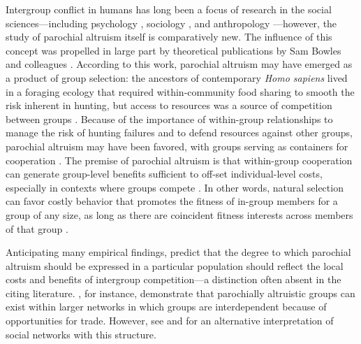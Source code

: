 \documentclass[bibauthoryear]{aa}
\begin{document}
Intergroup conflict in humans has long been a focus of research in the social sciences---including psychology \citep[e.g.,][]{tajfel1982social, yamagishi2016parochial}, sociology \citep[e.g.,][]{gluckman1960tribalism}, and anthropology \citep{Vayda1961}---however, the study of parochial altruism itself is comparatively new. The influence of this concept was propelled in large part by  theoretical publications by Sam Bowles and colleagues \citep{choi2007coevolution, bowles2003origins, bowles2004persistent}. According to this work, parochial altruism may have emerged as a product of group selection: the ancestors of contemporary \textit{Homo sapiens} lived in a foraging ecology that required within-community food sharing to smooth the risk inherent in hunting, but access to resources was a source of competition between groups \citep{choi2007coevolution}. Because of the importance of within-group relationships to  manage the risk of hunting failures and to defend resources against other groups, parochial altruism may have been favored, with groups serving as containers for cooperation \citep{boydricherson1985}.  The premise of parochial altruism is that within-group cooperation can generate group-level benefits sufficient to off-set individual-level costs, especially in contexts where groups compete \citep{choi2007coevolution}. %
	In other words, natural selection can favor costly behavior that promotes the fitness of in-group members for a group of any size, as long as there are coincident fitness interests across members of that group \citep{richerson2008not}.

Anticipating many empirical findings, \citet{bowles2003origins} predict that the degree to which parochial altruism should be expressed in a particular population should reflect the local costs and benefits of intergroup competition---a distinction often absent in the citing literature.  \citet{bowles2004persistent}, for instance, demonstrate that parochially altruistic groups can exist within larger networks in which groups are interdependent because of opportunities for trade. However, see \citet{yamagishi2011trust} and \citet{yamagishi2016parochial} for an alternative interpretation of social networks with this structure.
\end{document}

